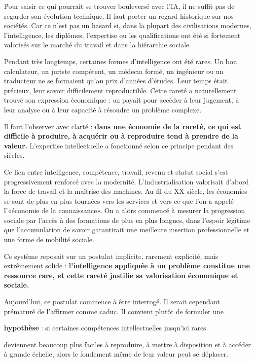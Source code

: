 
Pour saisir ce qui pourrait se trouver bouleversé avec l'IA, il ne suffit pas de regarder son évolution technique. Il faut porter un regard historique sur nos sociétés. Car ce n'est pas un hasard si, dans la plupart des civilisations modernes, l'intelligence, les diplômes, l'expertise ou les qualifications ont été si fortement valorisés sur le marché du travail et dans la hiérarchie sociale.

Pendant très longtemps, certaines formes d'intelligence ont été rares. Un bon calculateur, un juriste compétent, un médecin formé, un ingénieur ou un traducteur ne se formaient qu'au prix d'années d'études. Leur temps était précieux, leur savoir difficilement reproductible. Cette rareté a naturellement trouvé son expression économique : on payait pour accéder à leur jugement, à leur analyse ou à leur capacité à résoudre un problème complexe.

Il faut l'observer avec clarté : \textbf{dans une économie de la rareté, ce qui est difficile à produire, à acquérir ou à reproduire tend à prendre de la valeur.} L'expertise intellectuelle a fonctionné selon ce principe pendant des siècles.

Ce lien entre intelligence, compétence, travail, revenu et statut social s'est progressivement renforcé avec la modernité. L'industrialisation valorisait d'abord la force de travail et la maîtrise des machines. Au fil du XX siècle, les économies se sont de plus en plus tournées vers les services et vers ce que l'on a appelé l'«économie de la connaissance». On a alors commencé à mesurer la progression sociale par l'accès à des formations de plus en plus longues, dans l'espoir légitime que l'accumulation de savoir garantirait une meilleure insertion professionnelle et une forme de mobilité sociale.

Ce système reposait sur un postulat implicite, rarement explicité, mais extrêmement solide : \textbf{l'intelligence appliquée à un problème constitue une ressource rare, et cette rareté justifie sa valorisation économique et sociale.}

Aujourd'hui, ce postulat commence à être interrogé. Il serait cependant prématuré de l'affirmer comme caduc. Il convient plutôt de formuler une

\textbf{hypothèse} : si certaines compétences intellectuelles jusqu'ici rares

deviennent beaucoup plus faciles à reproduire, à mettre à disposition et à accéder à grande échelle, alors le fondement même de leur valeur peut se déplacer.


